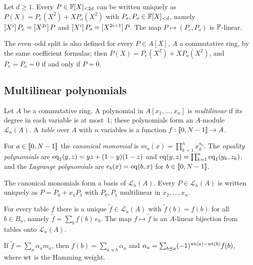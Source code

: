 \begin{lemma}\label{lem:splits}
Let $d \ge 1$. Every $P \in \mathbb{F}[X]_{<2d}$ can be written uniquely as $P(X) = P_e(X^2) + X P_o(X^2)$ with $P_e, P_o \in \mathbb{F}[X]_{<d}$, namely $[X^{i}]\,P_e = [X^{2i}]\,P$ and $[X^{i}]\,P_o = [X^{2i+1}]\,P$.
The map $P \mapsto (P_e, P_o)$ is $\mathbb{F}$-linear.
\end{lemma}

The even--odd split is also defined for every $P \in A[X]$, $A$ a commutative ring, by the same coefficient formulas; then $P(X) = P_e(X^2) + X P_o(X^2)$, and $P_e = P_o = 0$ if and only if $P = 0$.

\subsection{Multilinear polynomials}\label{sec:prelim:ml}

Let $A$ be a commutative ring.
A polynomial in $A[x_1,\dots,x_n]$ is \emph{multilinear} if its degree in each variable is at most~$1$; these polynomials form an $A$-module $\mathcal{L}_n(A)$.
A \emph{table} over $A$ with $n$ variables is a function $f : \llbracket 0, N-1 \rrbracket \to A$.

\begin{definition}\label{def:bases}
For $a \in \llbracket 0, N-1 \rrbracket$ the \emph{canonical monomial} is $m_a(x) = \prod_{k=1}^n x_k^{a_k}$.
The \emph{equality polynomials} are $\mathrm{eq}_1(y,z) = yz + (1-y)(1-z)$ and $\mathrm{eq}(y,z) = \prod_{k=1}^n \mathrm{eq}_1(y_k,z_k)$, and the \emph{Lagrange polynomials} are $e_b(x) = \mathrm{eq}(b,x)$ for $b \in \llbracket 0, N-1 \rrbracket$.
\end{definition}

The canonical monomials form a basis of $\mathcal{L}_n(A)$.
Every $P \in \mathcal{L}_n(A)$ is written uniquely as $P = P_0 + x_1 P_1$ with $P_0, P_1$ multilinear in $x_2,\dots,x_n$.

\begin{proposition}\label{prop:mle}
For every table $f$ there is a unique $\tilde f \in \mathcal{L}_n(A)$ with $\tilde f(b) = f(b)$ for all $b \in B_n$, namely $\tilde f = \sum_{b} f(b)\, e_b$.
The map $f \mapsto \tilde f$ is an $A$-linear bijection from tables onto $\mathcal{L}_n(A)$.
\end{proposition}

\begin{lemma}\label{lem:mobius}
If $\tilde f = \sum_a \alpha_a m_a$, then $f(b) = \sum_{a \preceq b} \alpha_a$ and $\alpha_a = \sum_{b \preceq a} (-1)^{\mathrm{wt}(a)-\mathrm{wt}(b)} f(b)$, where $\mathrm{wt}$ is the Hamming weight.
\end{lemma}

